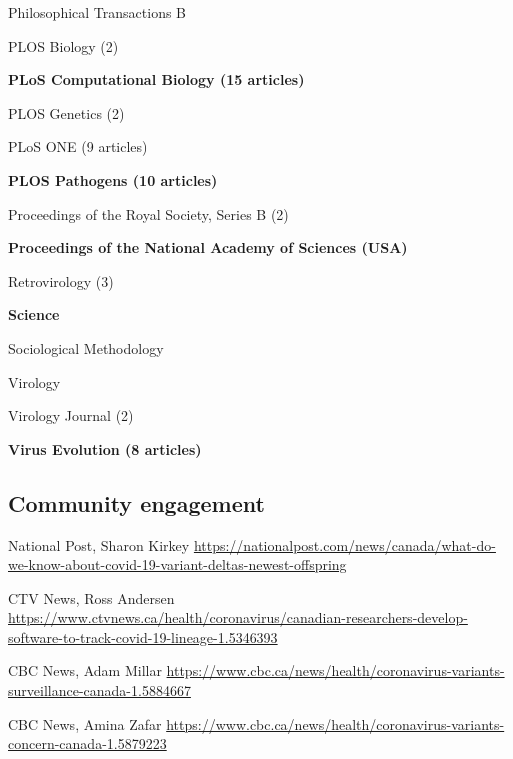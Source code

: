 {\begin{cvitemize}
\item Philosophical Transactions B
\item PLOS Biology         (2)                         
\item \textbf{PLoS Computational Biology     (15 articles)}
\item PLOS Genetics (2)
\item PLoS ONE   (9 articles)
\item \textbf{PLOS Pathogens   (10 articles)}
\item Proceedings of the Royal Society, Series B    (2)
\item \textbf{Proceedings of the National Academy of Sciences (USA)}
\item Retrovirology                                 (3)
\item \textbf{Science} 
\item Sociological Methodology                      
\item Virology                                      
\item Virology Journal                              (2)
\item \textbf{Virus Evolution           (8 articles)}
\end{cvitemize}
}


\subsection {Community engagement}

{National Post, Sharon Kirkey}
{\url{https://nationalpost.com/news/canada/what-do-we-know-about-covid-19-variant-deltas-newest-offspring}}
{}{}

{CTV News, Ross Andersen}
{\url{https://www.ctvnews.ca/health/coronavirus/canadian-researchers-develop-software-to-track-covid-19-lineage-1.5346393}}
{}{}

{CBC News, Adam Millar}
{\url{https://www.cbc.ca/news/health/coronavirus-variants-surveillance-canada-1.5884667}}
{}{}

{CBC News, Amina Zafar}
{\url{https://www.cbc.ca/news/health/coronavirus-variants-concern-canada-1.5879223}}
{}{}

